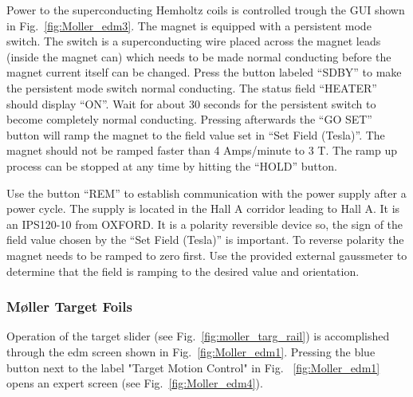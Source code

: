 { %

Power to the superconducting Hemholtz coils is controlled trough
the GUI shown in Fig.~\ref{fig:Moller_edm3}.
The magnet is equipped with a persistent mode switch.
The switch is a superconducting wire placed across the magnet leads
(inside the magnet can) which needs to be made normal conducting before the magnet current itself
can be changed. Press the button labeled ``SDBY'' to make the persistent mode switch normal conducting.
The status field ``HEATER'' should display ``ON''.
Wait for about 30 seconds for the persistent switch to become completely normal
conducting. Pressing afterwards the ``GO SET'' button will ramp the magnet
to the field value set in ``Set Field (Tesla)''. The magnet should not be ramped faster than
4 Amps/minute to 3 T. The ramp up process can be stopped at any time by hitting the ``HOLD''
button.

Use the button ``REM'' to establish communication with the power supply after a power cycle.
The supply is located in the Hall A corridor leading to Hall A. It is an IPS120-10 from OXFORD.
It is a polarity reversible device so, the sign of the field value chosen by the ``Set Field (Tesla)''
is important. To reverse polarity the magnet needs to be ramped to zero first. Use the provided external
gaussmeter to determine that the field is ramping to the desired value and orientation.



\subsubsection{M{\o}ller Target Foils}
Operation of the target slider (see Fig.~\ref{fig:moller_targ_rail}) is accomplished through the edm screen shown in
Fig.~\ref{fig:Moller_edm1}.
Pressing the blue button next to the label "Target Motion Control" in
Fig. ~\ref{fig:Moller_edm1} opens an expert screen (see Fig.~\ref{fig:Moller_edm4}).
}
